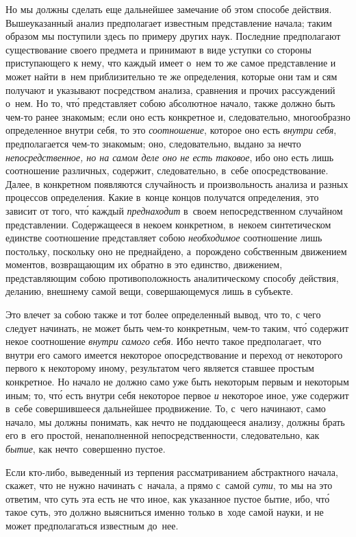 Но мы должны сделать еще дальнейшее замечание об этом способе действия.
Вышеуказанный анализ предполагает известным представление начала; таким образом
мы поступили здесь по примеру других наук. Последние предполагают существование
своего предмета и принимают в виде уступки со стороны приступающего к нему, что
каждый имеет о~нем то же самое представление и может найти в~нем приблизительно
те же определения, которые они там и сям получают и указывают посредством
анализа, сравнения и прочих рассуждений о~нем. Но то, чт\'{о} представляет
собою абсолютное начало, также должно быть чем-то ранее знакомым; если оно есть
конкретное и, следовательно, многообразно определенное внутри себя, то это
{\em соотношение}, которое оно есть {\em внутри себя}, предполагается чем-то
знакомым; оно, следовательно, выдано за нечто {\em непосредственное, но на
самом деле оно не есть таковое}, ибо оно есть лишь соотношение различных,
содержит, следовательно, в~себе опосредствование. Далее, в конкретном
появляются случайность и произвольность анализа и разных процессов определения.
Какие в~конце концов получатся определения, это зависит от того, чт\'{о} каждый
{\em преднаходит} в~своем непосредственном случайном представлении.
Содержащееся в некоем конкретном, в~некоем синтетическом единстве соотношение
представляет собою {\em необходимое} соотношение лишь постольку, поскольку оно
не преднайдено, а~порождено собственным движением моментов, возвращающим их
обратно в это единство, движением, представляющим собою противоположность
аналитическому способу действия, деланию, внешнему самой вещи, совершающемуся
лишь в субъекте.

Это влечет за собою также и тот более определенный вывод, что то, с чего
следует начинать, не может быть чем-то конкретным, чем-то таким, чт\'{о}
содержит некое соотношение {\em внутри самого себя}. Ибо нечто такое
предполагает, что внутри его самого имеется некоторое опосредствование и
переход от некоторого первого к некоторому иному, результатом чего является
ставшее простым конкретное. Но начало не должно само уже быть некоторым первым
и некоторым иным; то, чт\'{о} есть внутри себя некоторое первое {\em и}
некоторое иное, уже содержит в~себе совершившееся дальнейшее продвижение. То,
с~чего начинают, само начало, мы должны понимать, как нечто не поддающееся
анализу, должны брать его в~его простой, ненаполненной непосредственности,
следовательно, как {\em бытие}, как нечто~совершенно пустое.

Если кто-либо, выведенный из терпения рассматриванием абстрактного начала,
скажет, что не нужно начинать с~начала, а прямо с~самой {\em сути}, то мы на
это ответим, что суть эта есть не что иное, как указанное пустое бытие, ибо,
чт\'{о} такое суть, это должно выясниться именно только в~ходе самой науки,
и не может предполагаться известным до~нее.

